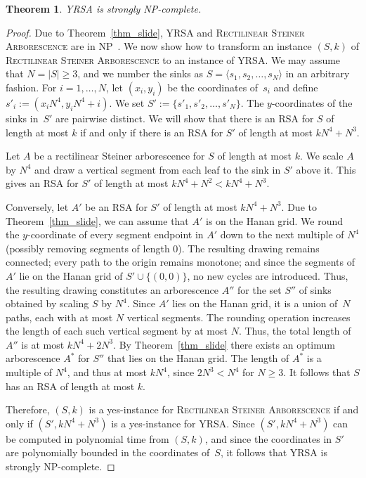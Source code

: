\documentclass[a4paper,11pt]{article}
\newtheorem{theorem}{Theorem}[section]
\newcommand{\qedopt}{}
\begin{document}
\begin{theorem}\label{thm_yrsa}
\textup{YRSA} is strongly \textup{NP}-complete.
\end{theorem}


\begin{proof}
Due to Theorem~\ref{thm_slide}, YRSA and 
\textsc{Rectilinear Steiner Arborescence} 
are in NP~\cite{shi_su}.
We now show how to transform an instance
$(S,k)$ of \textsc{Rectilinear Steiner Arborescence} to an
instance of YRSA. 
We may assume that $N = |S| \geq 3$, and we number the sinks as $S = \langle s_1, s_2, \dots, s_N \rangle$ in an arbitrary fashion.
For $i = 1, \dots, N$, let $(x_i, y_i)$ be the coordinates of~$s_i$ and define $s'_i := (x_iN^4, y_iN^4 + i)$.
We set $S' := \{s'_1, s'_2, \dots, s'_N\}$.
The $y$-coordinates of the sinks in~$S'$ are pairwise distinct.
We will show that there is an RSA for $S$ of length at most $k$
if and only if there is an RSA for $S'$ of length at most
$kN^4 + N^3$. 

Let $A$ be a rectilinear Steiner arborescence for $S$ of length at most $k$.
We scale $A$ by $N^4$ and draw a vertical segment from each leaf to the sink in $S'$
above it.
This gives an RSA for $S'$ of length at most $k N^4  + N^2 < k N^4 + N^3$.

Conversely, let $A'$ be an RSA for $S'$ of length at most $kN^4 + N^3$.
Due to Theorem~\ref{thm_slide}, we can assume that $A'$ is on the Hanan grid.
We round the $y$-coordinate of every segment endpoint in 
$A'$ down to the next multiple of $N^4$ (possibly removing segments of length 0).
The resulting drawing remains connected; every path to the origin 
remains monotone; and since the segments of $A'$ lie on the
Hanan grid of $S' \cup \{(0,0)\}$, no new cycles are introduced. 
Thus, the resulting drawing constitutes an arborescence $A''$ for 
the set $S''$ of sinks obtained by scaling $S$ by $N^4$.
Since $A'$ lies on the Hanan grid, it is a union of~$N$ paths, each with
at most $N$ vertical segments. 
The rounding operation increases the length of
each such vertical segment by at most $N$.
Thus, the total length of $A''$ is at most
$k N^4 + 2N^3$. By Theorem~\ref{thm_slide}
there exists an optimum arborescence $A^*$ for
$S''$ that lies on the Hanan grid. The
length of $A^*$ is a multiple of $N^4$, and thus
at most $kN^4$, since $2N^3 < N^4$ for $N \geq 3$.
 It follows that $S$ has an RSA of length at most $k$.


Therefore, $(S, k)$ is a yes-instance for \textsc{Rectilinear Steiner
Arborescence} if and only if $(S', kN^4 + N^3)$ is a yes-instance for
YRSA. Since $(S', kN^4 + N^3)$ can be computed in polynomial time 
from $(S, k)$, and since the coordinates in
$S'$ are polynomially bounded in the coordinates of~$S$, it follows that 
YRSA is strongly NP-complete.
\qedopt
\end{proof}
\end{document}
